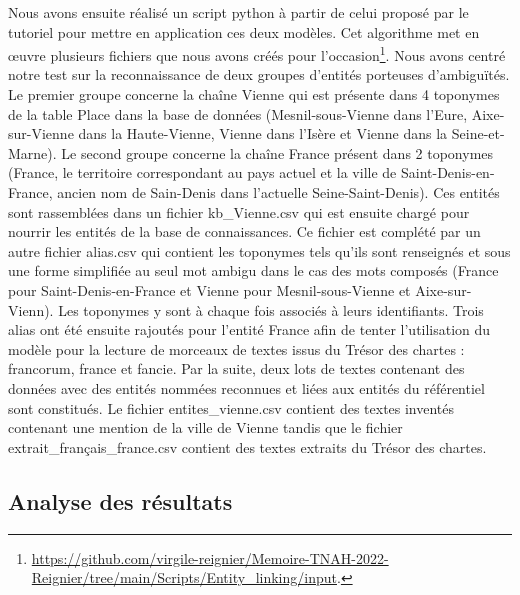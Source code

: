 \documentclass[a4paper,12pt,twoside]{book}
\begin{document}
	Nous avons ensuite réalisé un script python à partir de celui proposé par le tutoriel pour mettre en application ces deux modèles. Cet algorithme met en œuvre plusieurs fichiers que nous avons créés pour l'occasion\footnote{\url{https://github.com/virgile-reignier/Memoire-TNAH-2022-Reignier/tree/main/Scripts/Entity_linking/input}.}. Nous avons centré notre test sur la reconnaissance de deux groupes d'entités porteuses d'ambiguïtés. Le premier groupe concerne la chaîne \og Vienne\fg{} qui est présente dans 4 toponymes de la table Place dans la base de données (Mesnil-sous-Vienne dans l'Eure, Aixe-sur-Vienne dans la Haute-Vienne, Vienne dans l'Isère et Vienne dans la Seine-et-Marne). Le second groupe concerne la chaîne \og France\fg{} présent dans 2 toponymes (France, le territoire correspondant au pays actuel et la ville de Saint-Denis-en-France, ancien nom de Sain-Denis dans l'actuelle Seine-Saint-Denis). Ces entités sont rassemblées dans un fichier \og kb\_Vienne.csv\fg{} qui est ensuite chargé pour nourrir les entités de la base de connaissances. Ce fichier est complété par un autre fichier \og alias.csv\fg{} qui contient les toponymes tels qu'ils sont renseignés et sous une forme simplifiée au seul mot ambigu dans le cas des mots composés (\og France\fg{} pour Saint-Denis-en-France et \og Vienne\fg{} pour Mesnil-sous-Vienne et Aixe-sur-Vienn). Les toponymes y sont à chaque fois associés à leurs identifiants. Trois alias ont été ensuite rajoutés pour l'entité France afin de tenter l'utilisation du modèle pour la lecture de morceaux de textes issus du Trésor des chartes : \og francorum\fg{}, \og france\fg{} et \og fancie\fg{}. Par la suite, deux lots de textes contenant des données avec des entités nommées reconnues et liées aux entités du référentiel sont constitués. Le fichier \og 	entites\_vienne.csv\fg{} contient des textes inventés contenant une mention de la ville de Vienne tandis que le fichier \og extrait\_français\_france.csv\fg{} contient des textes extraits du Trésor des chartes.
	
	\subsection{Analyse des résultats}
	
\end{document}
